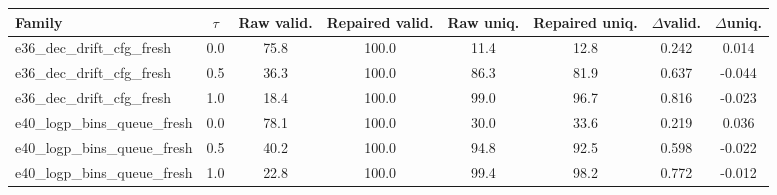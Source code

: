 \begin{tabular}{l c c c c c c c}
\toprule
Family & $\tau$ & Raw valid. & Repaired valid. & Raw uniq. & Repaired uniq. & $\Delta$valid. & $\Delta$uniq. \\
\midrule
e36_dec_drift_cfg_fresh & 0.0 & 75.8 & 100.0 & 11.4 & 12.8 & 0.242 & 0.014 \\
e36_dec_drift_cfg_fresh & 0.5 & 36.3 & 100.0 & 86.3 & 81.9 & 0.637 & -0.044 \\
e36_dec_drift_cfg_fresh & 1.0 & 18.4 & 100.0 & 99.0 & 96.7 & 0.816 & -0.023 \\
e40_logp_bins_queue_fresh & 0.0 & 78.1 & 100.0 & 30.0 & 33.6 & 0.219 & 0.036 \\
e40_logp_bins_queue_fresh & 0.5 & 40.2 & 100.0 & 94.8 & 92.5 & 0.598 & -0.022 \\
e40_logp_bins_queue_fresh & 1.0 & 22.8 & 100.0 & 99.4 & 98.2 & 0.772 & -0.012 \\
\bottomrule
\end{tabular}
